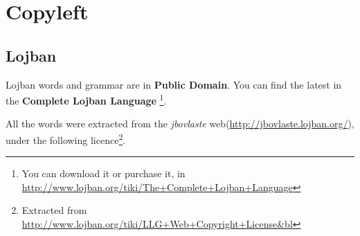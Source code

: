 \documentclass[ipa,twoside]{report}
\begin{document}
\label{cha:enloj}
\begin{multicols}{2}
%

\end{multicols}

\chapter*{Copyleft}

\pagestyle{plain}

\section*{Lojban}

Lojban words and grammar are in \textbf{Public Domain}. You can find the latest in the \textbf{Complete Lojban Language}%
\footnote{You can download it or purchase it, in \url{http://www.lojban.org/tiki/The+Complete+Lojban+Language}}.

All the words were extracted from the \textsl{jbovlaste} web(\url{http://jbovlaste.lojban.org/}), under the following licence\footnote{Extracted from \url{http://www.lojban.org/tiki/LLG+Web+Copyright+License&bl}}.
\end{document}
